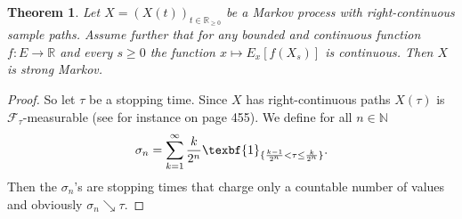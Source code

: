 \documentclass[12pt,a4paper]{scrartcl}
\newtheorem{theorem}{Theorem}[section]
\numberwithin{equation}{section}
\newcommand{\R}{\mathbb{R}} %
\newcommand{\N}{\mathbb{N}} %
\begin{document}
\begin{theorem}
Let $X= \left(X\left(t\right)\right)_{t \in \R_{\geq 0}}$ be a Markov process with right-continuous sample paths. Assume further that for any bounded and continuous function $f:E \to \R$ and every $s \geq 0$ the function $x \mapsto E_x\left[ f\left(X_s\right) \right]$ is continuous. Then $X$ is strong Markov.
\end{theorem}
\begin{proof}
So let $\tau$ be a stopping time. Since $X$ has right-continuous paths $X\left(\tau\right)$ is $\mathcal{F}_{\tau}$-measurable (see for instance \cite{klenke} on page 455). We define for all $n \in \N$
$$ \sigma_n = \sum_{k=1}^{\infty} \frac{k}{2^n} \texbf{1}_{\lbrace \frac{k-1}{2^n} < \tau \leq \frac{k}{2^n} \rbrace}. $$
Then the $\sigma_n$'s are stopping times that charge only a countable number of values and obviously $\sigma_n \searrow \tau.$ 


\end{proof}
\end{document}
